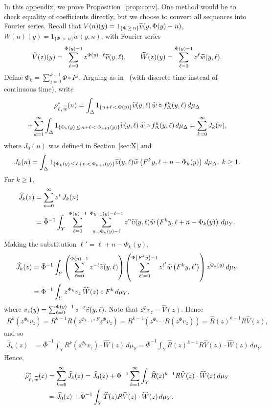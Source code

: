 \documentclass[10pt]{amsart}
\theoremstyle{definition}\newtheorem{defi}[theo]{Definition}\newtheorem{rema}[theo]{Remark}\newtheorem{exam}[theo]{Example}\newtheorem{exem}[theo]{Example}\newtheorem{nota}[theo]{Notation}
\newcommand{\hJ}{\widehat{J}}
\newcommand{\hR}{\widehat{R}}
\newcommand{\hT}{\widehat{T}}
\newcommand{\hV}{\widehat{V}}
\newcommand{\hW}{\widehat{W}}
\newcommand{\tw}{\widetilde{w}}
\newcommand{\tv}{\tilde{v}}
\newcommand{\bPhi}{\bar{\Phi}}
\let\oldtilde\tilde
\renewcommand*{\tilde}[1]{\mathchoice{\widetilde{#1}}{\widetilde{#1}}{\oldtilde{#1}}{\oldtilde{#1}}}
\let\oldhat\hat
\renewcommand*{\hat}[1]{\mathchoice{\widehat{#1}}{\widehat{#1}}{\oldhat{#1}}{\oldhat{#1}}}
\begin{document}
In this appendix, we prove Proposition~\ref{prop:conv}. One method would be to check equality of coefficients directly, but we choose to convert all sequences into Fourier series. Recall that $V(n)(y)=1_{\{\Phi\,\ge\,n\}}\tv(y,\Phi(y)-n)$, $W(n)(y)= 1_{\{\Phi\,>\,n\}}\tw(y,n)$, with Fourier series
\[
\hV(z)(y)=\sum_{\ell=0}^{\Phi(y)-1} z^{\Phi(y)-\ell}\tv(y,\ell), \qquad
\hW(z)(y)=\sum_{\ell=0}^{\Phi(y)-1} z^\ell\tw(y,\ell).
\]
Define $\Phi_k=\sum_{j=0}^{k-1}\Phi\circ F^j$. Arguing as in~\cite[Section~6.2]{M18} (with discrete time instead of continuous time), write
\begin{multline*}
\rho^*_{\tv,\,\tw}(n)  =\int_\Delta 1_{\left\{n+\ell\,<\,\Phi(y)\right\}}\tv(y,\ell)\,\tw\circ f_\Delta^n(y,\ell)\,d\mu_\Delta
\\ +\sum_{k=1}^\infty\int_\Delta 1_{\left\{\Phi_k(y)\,\le\,n+\ell\,<\,\Phi_{k+1}(y)\right\}}\tv(y,\ell)\,\tw\circ f_\Delta^n(y,\ell)\,d\mu_\Delta = \sum_{k=0}^\infty J_k(n),
\end{multline*}
where $J_0(n)$ was defined in Section~\ref{sec:X} and
\[
J_k(n)=
\int_\Delta 1_{\left\{\Phi_k(y)\,\le\,\ell+n\,<\,\Phi_{k+1}(y)\right\}}\tv(y,\ell)\tw\left(F^k y,\ell+n-\Phi_k(y)\right)\,d\mu_\Delta,\; k\ge1.
\]
For $k\ge1$,
\begin{align*}
\hJ_k(z) & =\sum_{n=0}^\infty z^nJ_k(n)\\
&=\bPhi^{-1}\int_Y\;\sum_{\ell=0}^{\Phi(y)-1}\;\sum_{n=\Phi_k(y)-\ell}^{\Phi_{k+1}(y)-\ell-1}z^n\tv(y,\ell)\tw\left(F^k y,\ell+n-\Phi_k(y)\right)\,d\mu_Y.
\end{align*}
Making the substitution $\ell'=\ell+n-\Phi_k(y)$,
\begin{align*}
\hJ_k(z) & =\bPhi^{-1}\int_Y\left(\sum_{\ell=0}^{\Phi(y)-1}z^{-\ell}\tv(y,\ell)\right)
\left(\sum_{\ell'=0}^{\Phi\left(F^k y\right)-1}z^{\ell'}\tw\left(F^k y,\ell'\right)\right)z^{\Phi_k(y)}\,d\mu_Y
\\ & = \bPhi^{-1}\int_Y z^{\Phi_k}v_z \,\hW(z)\circ F^k\,d\mu_Y,
\end{align*}
where $v_z(y)=\sum_{\ell=0}^{\Phi(y)-1}z^{-\ell}\tv(y,\ell)$. Note that $z^{\Phi}v_z=\hV(z)$. Hence
\begin{align*}
R^k\left(z^{\Phi_k}v_z\right)=R^{k-1}R\left(z^{\Phi_{k-1}\circ F}z^{\Phi}v_z\right) =R^{k-1}\left(z^{\Phi_{k-1}}R\left(z^{\Phi}v_z\right)\right) =\hR(z)^{k-1}R\hV(z),
\end{align*}
and so
\begin{align*}
\hJ_k(z) & = \bPhi^{-1}\int_Y R^k\left(z^{\Phi_k}v_z\right) \cdot \hW(z)\,d\mu_Y = \bPhi^{-1}\int_Y \hR(z)^{k-1}R\hV(z) \cdot \hW(z)\,d\mu_Y.
\end{align*}
Hence,
\begin{align*}
\hat\rho^*_{\tv,\,\tw}(z) & = \sum_{k=0}^\infty \hJ_k(z) =\hJ_0(z)+\bPhi^{-1}\sum_{k=1}^\infty \int_Y \hR(z)^{k-1}R\hV(z)\cdot \hW(z)\,d\mu_Y
\\ & =\hJ_0(z)+\bPhi^{-1}\int_Y \hT(z)R\hV(z)\cdot \hW(z)\,d\mu_Y.
\end{align*}
\end{document}
